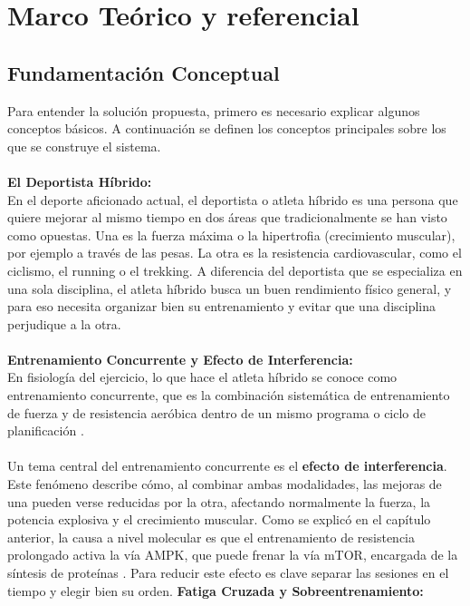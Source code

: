 \newpage
\section{Marco Teórico y referencial}
\subsection{Fundamentación Conceptual}
Para entender la solución propuesta, primero es necesario explicar algunos conceptos básicos. A continuación se definen los conceptos principales sobre los que se construye el sistema.
\\\\
\textbf{El Deportista Híbrido:}\\
En el deporte aficionado actual, el deportista o atleta híbrido es una persona que quiere mejorar al mismo tiempo en dos áreas que tradicionalmente se han visto como opuestas. Una es la fuerza máxima o la hipertrofia (crecimiento muscular), por ejemplo a través de las pesas. La otra es la resistencia cardiovascular, como el ciclismo, el running o el trekking. A diferencia del deportista que se especializa en una sola disciplina, el atleta híbrido busca un buen rendimiento físico general, y para eso necesita organizar bien su entrenamiento y evitar que una disciplina perjudique a la otra.
\\\\
\textbf{Entrenamiento Concurrente y Efecto de Interferencia:}\\
En fisiología del ejercicio, lo que hace el atleta híbrido se conoce como entrenamiento concurrente, que es la combinación sistemática de entrenamiento de fuerza y de resistencia aeróbica dentro de un mismo programa o ciclo de planificación \citep{fisiologiadelejercicio}.
\\\\
Un tema central del entrenamiento concurrente es el \textbf{efecto de interferencia}. Este fenómeno describe cómo, al combinar ambas modalidades, las mejoras de una pueden verse reducidas por la otra, afectando normalmente la fuerza, la potencia explosiva y el crecimiento muscular. Como se explicó en el capítulo anterior, la causa a nivel molecular es que el entrenamiento de resistencia prolongado activa la vía AMPK, que puede frenar la vía mTOR, encargada de la síntesis de proteínas \citep{aptavs2025concurrente}. Para reducir este efecto es clave separar las sesiones en el tiempo y elegir bien su orden.
\textbf{Fatiga Cruzada y Sobreentrenamiento:}\\
